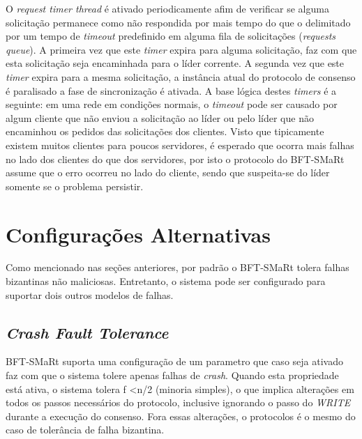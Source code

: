 	 O \textit{request timer thread} é ativado periodicamente afim de verificar se alguma solicitação permanece como não respondida por mais tempo do que o delimitado por um tempo de \textit{timeout} predefinido em alguma fila de solicitações (\textit{requests queue}). A primeira vez que este \textit{timer} expira para alguma solicitação, faz com que esta solicitação seja encaminhada para o líder corrente. A segunda vez que este \textit{timer} expira para a mesma solicitação, a instância atual do protocolo de consenso é paralisado a fase de sincronização é ativada. A base lógica destes \textit{timers} é a seguinte: em uma rede em condições normais, o \textit{timeout} pode ser causado por algum cliente que não enviou a solicitação ao líder ou pelo líder que não encaminhou os pedidos das solicitações dos clientes. Visto que tipicamente existem muitos clientes para poucos servidores, é esperado que ocorra mais falhas no lado dos clientes do que dos servidores, por isto o protocolo do BFT-SMaRt assume que o erro ocorreu no lado do cliente, sendo que suspeita-se do líder somente se o problema persistir. \\
	 
	 \section{Configurações Alternativas}
	 
	 Como mencionado nas seções anteriores, por padrão o BFT-SMaRt tolera falhas bizantinas não maliciosas. Entretanto, o sistema pode ser configurado para suportar dois outros modelos de falhas.\\
	 
	 	\subsection{\textit{Crash Fault Tolerance}}
	 	BFT-SMaRt suporta uma configuração de um parametro que caso seja ativado faz com que o sistema tolere apenas falhas de \textit{crash}. Quando esta propriedade está ativa, o sistema tolera  f \textless  n/2 (minoria simples), o que implica alterações em todos os passos necessários do protocolo, inclusive ignorando o passo do \textit{WRITE} durante a execução do consenso. Fora essas alterações, o protocolos é o mesmo do caso de tolerância de falha bizantina. 
	 	
